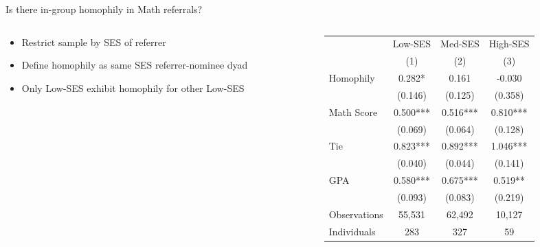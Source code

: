 \documentclass[aspectratio=169,xcolor=dvipsnames]{beamer}
\begin{document}
\begin{frame}{Is there in-group homophily in Math referrals?}
    \begin{columns}[T]
        \begin{column}{0.38\textwidth}
            \vspace{2em}
            \begin{itemize}
                \item Restrict sample by SES of referrer
                \item Define homophily as same SES referrer-nominee dyad
                \item Only Low-SES exhibit homophily for other Low-SES
            \end{itemize}
        \end{column}
        \begin{column}{0.62\textwidth}
            \begin{table}
                \centering
                \footnotesize
                \begin{threeparttable}
                \begin{tabular*}{0.9\columnwidth}{@{\extracolsep{\fill}}lccc}
                \toprule
                & Low-SES & Med-SES & High-SES \\
                 & \multicolumn{1}{c}{(1)} & \multicolumn{1}{c}{(2)} & \multicolumn{1}{c}{(3)} \\
                \midrule
                Homophily & 0.282* & 0.161 & -0.030 \\
                 & (0.146) & (0.125) & (0.358) \\
                Math Score  & 0.500*** & 0.516*** & 0.810*** \\
                 & (0.069) & (0.064) & (0.128) \\
                Tie & 0.823*** & 0.892*** & 1.046*** \\
                 & (0.040) & (0.044) & (0.141) \\
                GPA & 0.580*** & 0.675*** & 0.519** \\
                 & (0.093) & (0.083) & (0.219) \\
                \midrule
                Observations & 55,531 & 62,492 & 10,127 \\
                Individuals & 283 & 327 & 59 \\
                \bottomrule
                \end{tabular*}
                \label{tab:homophily_math}
                \end{threeparttable}
            \end{table}
        \end{column}
    \end{columns}
\end{frame}
\end{document}
